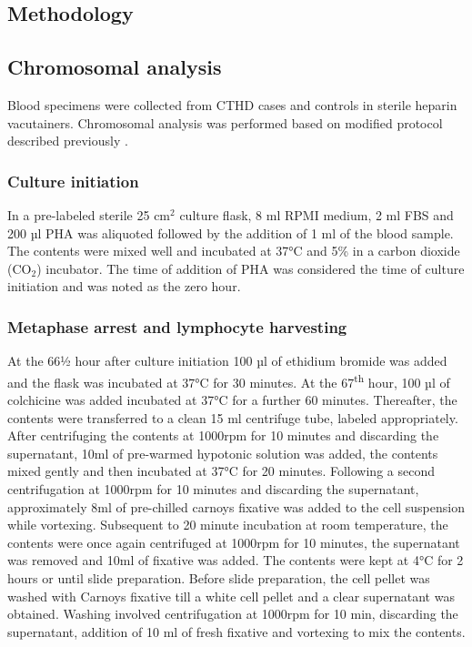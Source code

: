 \begin{refsection}
\section{Methodology}

\subsection{Chromosomal analysis} \label{chranalysis}
Blood specimens were collected from CTHD cases and controls in sterile heparin vacutainers.
Chromosomal analysis was performed based on modified protocol described previously \cite{barch1997agt, moorhead1960chromosome, babu1995human, dracopoli1994current}.
\subsubsection{Culture initiation}
In a pre-labeled sterile 25 cm$^2$ culture flask, 8 ml RPMI medium, 2 ml FBS and 200 µl PHA was aliquoted followed by the addition of 1 ml of the blood sample. The contents were mixed well and incubated at 37°C and 5\% in a carbon dioxide (CO$_2$) incubator. The time of addition of PHA was considered the time of culture initiation and was noted as the zero hour.
\subsubsection{Metaphase arrest and lymphocyte harvesting}
At the 66½ hour after culture initiation 100 µl of ethidium bromide was added and the flask was incubated at 37°C for 30 minutes. At the 67\textsuperscript{th} hour, 100 µl of colchicine was added incubated at 37°C for a further 60 minutes. Thereafter, the contents were transferred to a clean 15 ml centrifuge tube, labeled appropriately. After centrifuging the contents at 1000rpm for 10 minutes and discarding the supernatant, 10ml of pre-warmed hypotonic solution was added, the contents mixed gently and then incubated at 37°C for 20 minutes. Following a second centrifugation at 1000rpm for 10 minutes and discarding the supernatant, approximately 8ml of pre-chilled carnoys fixative was added to the cell suspension while vortexing. Subsequent to 20 minute incubation at room temperature, the contents were once again centrifuged at 1000rpm for 10 minutes, the supernatant was removed and 10ml of fixative was added. The contents were kept at 4°C for 2 hours or until slide preparation. Before slide preparation, the cell pellet was washed with Carnoys fixative till a white cell pellet and a clear supernatant was obtained. Washing involved centrifugation at 1000rpm for 10 min, discarding the supernatant, addition of 10 ml of fresh fixative and vortexing to mix the contents.

\end{refsection}
